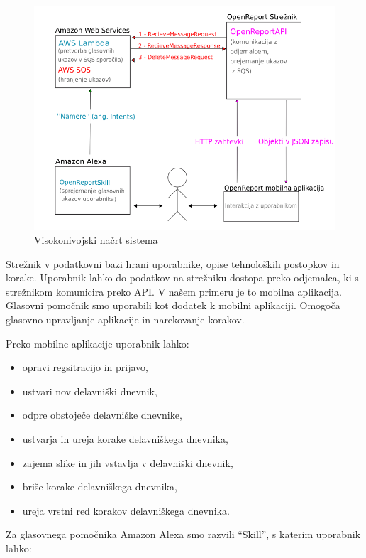 \documentclass[a4paper, 12pt]{book}
\begin{document}
\begin{figure}[H]
\begin{center}
\includegraphics[width=13cm]{plan}
\end{center}
\caption{Visokonivojski načrt sistema}
\label{plan}
\end{figure}

Strežnik v podatkovni bazi hrani uporabnike, opise tehnoloških postopkov in korake.
Uporabnik lahko do podatkov na strežniku dostopa preko odjemalca, ki s strežnikom komunicira preko API.
V našem primeru je to mobilna aplikacija.
Glasovni pomočnik smo uporabili kot dodatek k mobilni aplikaciji.
Omogoča glasovno upravljanje aplikacije in narekovanje korakov.

\noindent Preko mobilne aplikacije uporabnik lahko:
\begin{itemize}
	\item opravi regsitracijo in prijavo,
	\item ustvari nov delavniški dnevnik,
	\item odpre obstoječe delavniške dnevnike,
	\item ustvarja in ureja korake delavniškega dnevnika,
	\item zajema slike in jih vstavlja v delavniški dnevnik,
	\item briše korake delavniškega dnevnika,
	\item ureja vrstni red korakov delavniškega dnevnika.
\end{itemize}

Za glasovnega pomočnika Amazon Alexa smo razvili \enquote{Skill}, s katerim uporabnik lahko:
\end{document}

